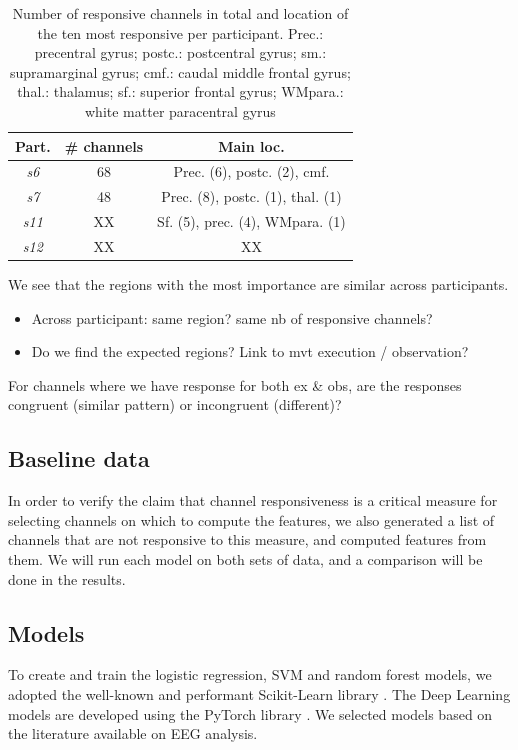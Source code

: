 \documentclass[10pt,conference,compsocconf]{IEEEtran}
\begin{document}
\begin{table}[h!]
    \centering
    \begin{tabular}{| c | c | c |}
        \hline
        Part. & \# channels & Main loc. \\
        \hline
        \textit{s6} & 68 & Prec. (6), postc. (2), cmf. \\
        \hline
        \textit{s7} & 48 & Prec. (8), postc. (1), thal. (1) \\
        \hline
        \textit{s11} & XX & Sf. (5), prec. (4), WMpara. (1) \\
        \hline
        \textit{s12} & XX & XX \\
        \hline
    \end{tabular}
    \caption{Number of responsive channels in total and location of the ten most responsive per participant. Prec.: precentral gyrus; postc.: postcentral gyrus; sm.: supramarginal gyrus; cmf.: caudal middle frontal gyrus; thal.: thalamus; sf.: superior frontal gyrus; WMpara.: white matter paracentral gyrus}
    \label{tab:actionrecogchannellocations}
\end{table}

We see that the regions with the most importance are similar across participants.

\begin{itemize}
    \item Across participant: same region? same nb of responsive channels?
    \item Do we find the expected regions? Link to mvt execution / observation?
\end{itemize}

For channels where we have response for both ex \& obs, are the responses congruent (similar pattern) or incongruent (different)?

\subsection{Baseline data}
In order to verify the claim that channel responsiveness is a critical measure for selecting channels on which to compute the features, we also generated a list of channels that are not responsive to this measure, and computed features from them. We will run each model on both sets of data, and a comparison will be done in the results.

\subsection{Models}
To create and train the logistic regression, SVM and random forest models, we adopted the well-known and performant Scikit-Learn library \cite{scikitlearn}. The Deep Learning models are developed using the PyTorch library \cite{pytorch}. We selected models based on the literature available on EEG analysis.
\end{document}

